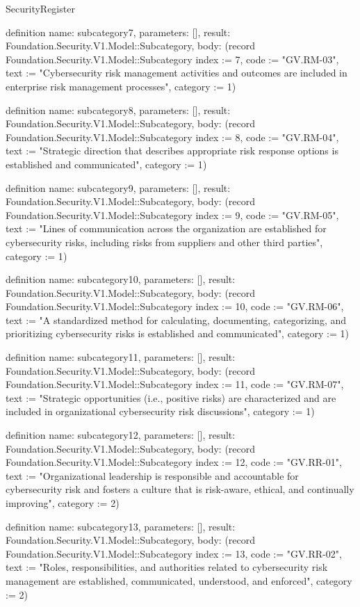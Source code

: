 \begin{lexlean}{SecurityRegister}
\begin{semanticmodule}
definition{
  name: subcategory7,
  parameters: [],
  result: Foundation.Security.V1.Model::Subcategory,
  body: (record Foundation.Security.V1.Model::Subcategory {index := 7, code := "GV.RM-03", text := "Cybersecurity risk management activities and outcomes are included in enterprise risk management processes", category := 1})
}

definition{
  name: subcategory8,
  parameters: [],
  result: Foundation.Security.V1.Model::Subcategory,
  body: (record Foundation.Security.V1.Model::Subcategory {index := 8, code := "GV.RM-04", text := "Strategic direction that describes appropriate risk response options is established and communicated", category := 1})
}

definition{
  name: subcategory9,
  parameters: [],
  result: Foundation.Security.V1.Model::Subcategory,
  body: (record Foundation.Security.V1.Model::Subcategory {index := 9, code := "GV.RM-05", text := "Lines of communication across the organization are established for cybersecurity risks, including risks from suppliers and other third parties", category := 1})
}

definition{
  name: subcategory10,
  parameters: [],
  result: Foundation.Security.V1.Model::Subcategory,
  body: (record Foundation.Security.V1.Model::Subcategory {index := 10, code := "GV.RM-06", text := "A standardized method for calculating, documenting, categorizing, and prioritizing cybersecurity risks is established and communicated", category := 1})
}

definition{
  name: subcategory11,
  parameters: [],
  result: Foundation.Security.V1.Model::Subcategory,
  body: (record Foundation.Security.V1.Model::Subcategory {index := 11, code := "GV.RM-07", text := "Strategic opportunities (i.e., positive risks) are characterized and are included in organizational cybersecurity risk discussions", category := 1})
}

definition{
  name: subcategory12,
  parameters: [],
  result: Foundation.Security.V1.Model::Subcategory,
  body: (record Foundation.Security.V1.Model::Subcategory {index := 12, code := "GV.RR-01", text := "Organizational leadership is responsible and accountable for cybersecurity risk and fosters a culture that is risk-aware, ethical, and continually improving", category := 2})
}

definition{
  name: subcategory13,
  parameters: [],
  result: Foundation.Security.V1.Model::Subcategory,
  body: (record Foundation.Security.V1.Model::Subcategory {index := 13, code := "GV.RR-02", text := "Roles, responsibilities, and authorities related to cybersecurity risk management are established, communicated, understood, and enforced", category := 2})
}


\end{semanticmodule}
\end{lexlean}
